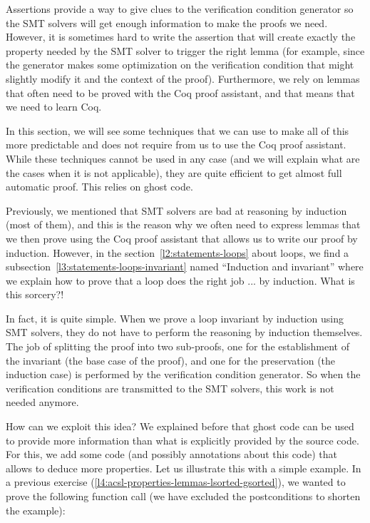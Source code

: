Assertions provide a way to give clues to the verification condition generator
so the SMT solvers will get enough information to make the proofs we
need. However, it is sometimes hard to write the assertion that will
create exactly the property needed by the SMT solver to trigger the right lemma
(for example, since the generator makes some optimization on the verification
condition that might slightly modify it and the context of the proof).
Furthermore, we rely on lemmas that often need to be proved with the Coq proof
assistant, and that means that we need to learn Coq.



In this section, we will see some techniques that we can use to make all of this
more predictable and does not require from us to use the Coq proof assistant.
While these techniques cannot be used in any case (and we will explain what are
the cases when it is not applicable), they are quite efficient to get almost
full automatic proof. This relies on ghost code.






Previously, we mentioned that SMT solvers are bad at reasoning by induction
(most of them), and this is the reason why we often need to express lemmas that
we then prove using the Coq proof assistant that allows us to write our proof
by induction. However, in the section~\ref{l2:statements-loops} about loops, we
find a subsection~\ref{l3:statements-loops-invariant} named ``Induction and
invariant'' where we explain how to prove that a loop does the right job ... by
induction. What is this sorcery?!




In fact, it is quite simple. When we prove a loop invariant by induction using
SMT solvers, they do not have to perform the reasoning by induction themselves.
The job of splitting the proof into two sub-proofs, one for the establishment of
the invariant (the base case of the proof), and one for the preservation (the
induction case) is performed by the verification condition generator. So when
the verification conditions are transmitted to the SMT solvers, this work is not
needed anymore.




How can we exploit this idea? We explained before that ghost code can be used to
provide more information than what is explicitly provided by the source code.
For this, we add some code (and possibly annotations about this code) that
allows to deduce more properties. Let us illustrate this with a simple example.
In a previous exercise (\ref{l4:acsl-properties-lemmas-lsorted-gsorted}), we
wanted to prove the following function call (we have excluded the postconditions
to shorten the example):



